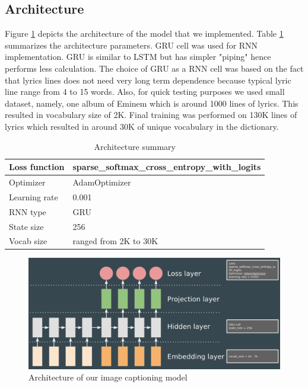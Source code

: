 \documentclass{article}
\begin{document}
\subsection{Architecture}
Figure \ref{fig:our-arch} depicts the architecture of the model that we implemented. Table \ref{tab:arch-summary} summarizes the architecture parameters. GRU cell was used for RNN implementation. GRU is similar to LSTM but has simpler "piping" hence performs less calculation. The choice of GRU as a RNN cell was based on the fact that lyrics lines does not need very long term dependence because typical lyric line range from 4 to 15 words. Also, for quick testing purposes we used small dataset, namely, one album of Eminem which is around 1000 lines of lyrics. This resulted in vocabulary size of 2K. Final training was performed on 130K lines of lyrics which resulted in around 30K of unique vocabulary in the dictionary.
\begin{table}[]
\centering
\label{tab:arch-summary}
\begin{tabular}{|l|l|}
\hline
Loss function & sparse\_softmax\_cross\_entropy\_with\_logits \\ \hline
Optimizer     & AdamOptimizer                                 \\ \hline
Learning rate & 0.001                                         \\ \hline
RNN type      & GRU                                           \\ \hline
State size    & 256                                           \\ \hline
Vocab size    & ranged from 2K to 30K                         \\ \hline
\end{tabular}
\caption{Architecture summary}

\end{table}

\begin{figure}[!ht]
\centering
\includegraphics[scale=0.2]{4.png}
\caption{Architecture of our image captioning model}
\label{fig:our-arch}
\end{figure}
\end{document}
